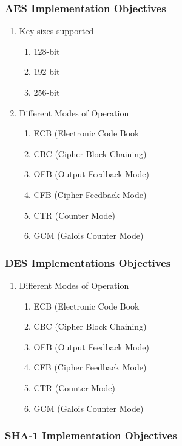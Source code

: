 \subsubsection{AES Implementation Objectives}

\begin{enumerate}
\item{Key sizes supported
	\begin{enumerate}
		\item{128-bit}
		\item{192-bit}
		\item{256-bit}
	\end{enumerate}
}
\item{
Different Modes of Operation
	\begin{enumerate}
		\item{ECB (Electronic Code Book}
		\item{CBC (Cipher Block Chaining)}
		\item{OFB (Output Feedback Mode)}
		\item{CFB (Cipher Feedback Mode)}
		\item{CTR (Counter Mode)}
		\item{GCM (Galois Counter Mode)}
	\end{enumerate}
}
\end{enumerate}

\subsubsection{DES Implementations Objectives}

\begin{enumerate}
\item{
Different Modes of Operation
	\begin{enumerate}
		\item{ECB (Electronic Code Book}
		\item{CBC (Cipher Block Chaining)}
		\item{OFB (Output Feedback Mode)}
		\item{CFB (Cipher Feedback Mode)}
		\item{CTR (Counter Mode)}
		\item{GCM (Galois Counter Mode)}
	\end{enumerate}
}
\end{enumerate}

\subsubsection{SHA-1 Implementation Objectives}

